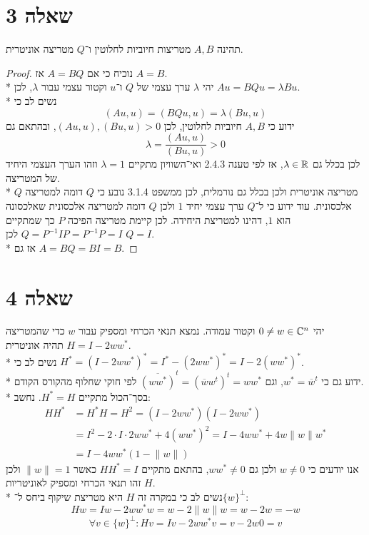 \section{שאלה 3}
תהינה $A, B$ מטריצות חיוביות לחלוטין ו־$Q$ מטריצה אוניטרית.
\begin{proof}
	נוכיח כי אם $A = BQ$ אז $A = B$. \\*
	יהי $\lambda$ ערך עצמי של $Q$ ו־$u$ וקטור עצמי עבור $\lambda$, לכן $A u = B Q u = \lambda B u$. \\*
	נשים לב כי
	\[
		(A u, u) = (B Q u, u) = \lambda (B u, u)
	\]
	ידוע כי $A, B$ חיוביות לחלוטין, לכן $(Au, u), (Bu, u) > 0$, ובהתאם גם
	\[
		\lambda = \frac{(A u, u)}{(B u, u)} > 0
	\]
	לכן בכלל גם $\lambda \in \mathbb{R}$, אז לפי טענה 2.4.3 ואי־השוויון מתקיים $\lambda = 1$ וזהו הערך העצמי היחיד של המטריצה. \\*
	$Q$ מטריצה אוניטרית ולכן בכלל גם נורמלית, לכן ממשפט 3.1.4 נובע כי $Q$ דומה למטריצה אלכסונית.
	עוד ידוע כי ל־$Q$ ערך עצמי יחיד $1$ ולכן $Q$ דומה למטריצה אלכסונית שאלכסונה הוא $1$, דהינו למטריצת היחידה.
	לכן קיימת מטריצה הפיכה $P$ כך שמתקיים $Q = P^{-1} I P = P^{-1} P = I$ לכן $Q = I$. \\*
	אז גם $A = B Q = B I = B$.
\end{proof}

\section{שאלה 4}
יהי $0 \ne w \in \mathbb{C}^n$ וקטור עמודה. נמצא תנאי הכרחי ומספיק עבור $w$ כדי שהמטריצה $H = I - 2 w w^*$ תהיה אוניטרית. \\*
נשים לב כי $H^* = {(I - 2 ww^*)}^* = I^* - {(2ww^*)}^* = I - 2{(ww^*)}^*$. \\*
ידוע גם כי $w^* = \overline{w}^t$, וגם ${\overline{(w w^*)}}^t = {(\overline{w} w^t)}^t = w w^*$ לפי חוקי שחלוף מהקורס הקודם. \\*
בסך־הכול מתקיים $H^* = H$. נחשב:
\begin{align*}
	H H^* & = H^* H = H^2 = (I - 2w w^*)(I - 2w w^*) \\
		  & = I^2 - 2 \cdot I \cdot 2w w^* + 4{(ww^*)}^2 = I - 4ww^* + 4w \lVert w \rVert w^* \\
		  & = I - 4 ww^* (1 - \lVert w \rVert)
\end{align*}
אנו יודעים כי $w \ne 0$ ולכן גם $ww^* \ne 0$, בהתאם מתקיים $H H^* = I$ כאשר $\lVert w \rVert = 1$ ולכן זהו תנאי הכרחי ומספיק לאוניטריות $H$. \\*
נשים לב כי במקרה זה $H$ היא מטריצת שיקוף ביחס ל־${\{ w \}}^\perp$:
\[
	H w = I w - 2w w^* w = w - 2 \lVert w \rVert w = w - 2w = -w
\]
\[
	\forall v \in {\{ w \}}^\perp: H v = I v - 2 w w^* v = v - 2w 0 = v
\]

